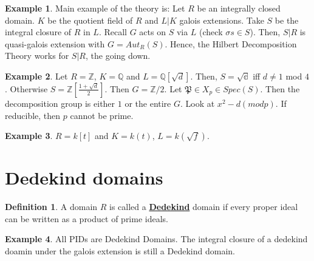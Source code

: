 \documentclass{article}
\theoremstyle{definition}
\theoremstyle{definition}
\theoremstyle{definition}
\theoremstyle{definition}
\theoremstyle{definition}
\newtheorem{definition}{Definition}[section]
\theoremstyle{definition}
\theoremstyle{definition}
\newtheorem{example}{Example}[section]
\begin{document}
\begin{tcolorbox}[colback=yellow!5!white,colframe=yellow!30!white]
\begin{example}
Main example of the theory is: Let $R$ be an integrally closed domain. $K$ be the quotient field of $R$ and $L|K$ galois extensions. Take $S$ be the integral closure of $R$ in $L$. Recall $G$ acts on $S$ via $L$ (check $\sigma s\in S$). Then, $S|R$ is quasi-galois extension with $G=Aut_R(S)$. Hence, the Hilbert Decomposition Theory works for $S|R$, the going down. 
\end{example}
\end{tcolorbox}



\begin{tcolorbox}[colback=yellow!5!white,colframe=yellow!30!white]
\begin{example}
Let $R=\mathbb{Z}$, $K=\mathbb{Q}$ and $L=\mathbb{Q}[\sqrt{d}]$. Then, $S=\mathbb{\sqrt{d}}$ iff $d\neq 1$ mod $4$. Otherwise $S=\mathbb{Z}[\frac{1+\sqrt{d}}{2}]$.
Then $G=\mathbb{Z}/2$. Let $\mathfrak{P}\in X_p\in Spec(S)$. Then the decomposition group is either $1$ or the entire $G$. Look at $x^2-d(mod p)$. If reducible, then $p$ cannot be prime.

\end{example}
\end{tcolorbox}



\begin{tcolorbox}[colback=yellow!5!white,colframe=yellow!30!white]
\begin{example}
$R=k[t]$ and $K=k(t)$, $L=k(\sqrt{f})$.
\end{example}
\end{tcolorbox}

\section{Dedekind domains}


\begin{tcolorbox}[colback=purple!5!white,colframe=purple!75!black]
\begin{definition}
A domain $R$ is called a \underline{\textbf{Dedekind}} domain if every proper ideal can be written as a product of prime ideals.
\end{definition}
\end{tcolorbox}
\begin{tcolorbox}[colback=yellow!5!white,colframe=yellow!30!white]
    \begin{example}
    All PIDs are Dedekind Domains. The integral closure of a dedekind doamin under the galois extension is still a Dedekind domain.
    \end{example}
    \end{tcolorbox}
    
\end{document}
